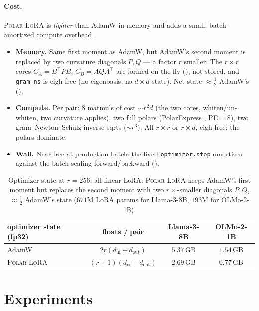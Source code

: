 \documentclass[11pt]{article}
\newcommand{\methodname}{\textsc{Polar-LoRA}\xspace}
\theoremstyle{plain}
\theoremstyle{definition}
\theoremstyle{remark}
\begin{document}
\paragraph{Cost.} \methodname{} is \emph{lighter} than AdamW in memory and adds a small, batch-amortized compute overhead.
\begin{itemize}[leftmargin=1.5em,itemsep=1pt,topsep=2pt]
  \item \textbf{Memory.} Same first moment as AdamW, but AdamW's second moment is replaced by two curvature diagonals $P,Q$ --- a factor $r$ smaller. The $r\times r$ cores $C_A=B^\top PB$, $C_B=AQA^\top$ are formed on the fly (), not stored, and \texttt{gram\_ns} is eigh-free (no eigenbasis, no $d\times d$ state). Net state ${\approx}\tfrac12$ AdamW's ().
  \item \textbf{Compute.} Per pair: $8$ matmuls of cost ${\sim}r^2d$ (the two cores, whiten/un-whiten, two curvature applies), two full polars (PolarExpress \cite{polarexpress}, PE${=}8$), two gram--Newton--Schulz inverse-sqrts \cite{gram_ns} (${\sim}r^3$). All $r\times r$ or $r\times d$, eigh-free; the polars dominate.
  \item \textbf{Wall.} Near-free at production batch: the fixed \texttt{optimizer.step} amortizes against the batch-scaling forward/backward ().
\end{itemize}
\begin{table}[h]
\centering\small
\begin{tabular}{lccc}
\toprule
optimizer state (fp32) & floats / pair & Llama-3-8B & OLMo-2-1B \\
\midrule
AdamW         & $2r(d_{\mathrm{in}}{+}d_{\mathrm{out}})$     & $5.37$\,GB & $1.54$\,GB \\
\methodname{} & $(r{+}1)(d_{\mathrm{in}}{+}d_{\mathrm{out}})$ & $2.69$\,GB & $0.77$\,GB \\
\bottomrule
\end{tabular}
\caption{Optimizer state at $r{=}256$, all-linear LoRA: \methodname{} keeps AdamW's first moment but replaces the second moment with two $r{\times}$-smaller diagonals $P,Q$, ${\approx}\tfrac12$ AdamW's state ($671$M LoRA params for Llama-3-8B, $193$M for OLMo-2-1B).}
\label{tab:optstate}
\end{table}

\section{Experiments}
\label{sec:exp}
\end{document}
